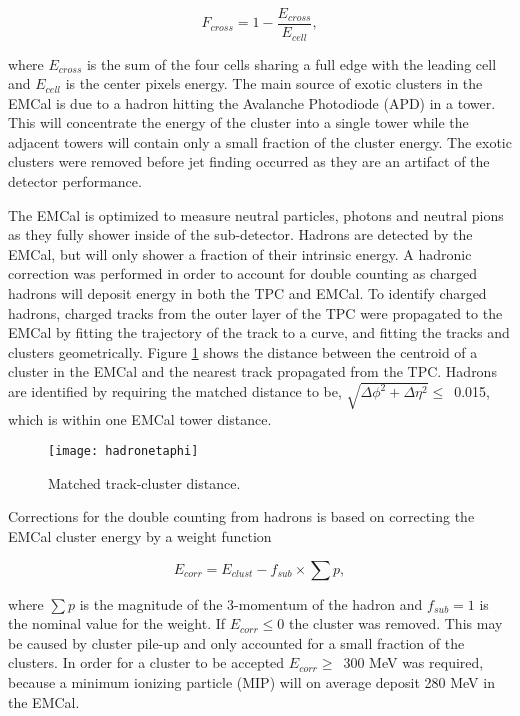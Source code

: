 \begin{equation}
F_{cross} = 1 - \frac{ E_{cross} }{ E_{cell} },
\label{eq:Fcross}
\end{equation}

\noindent
where $E_{cross}$ is the sum of the four cells sharing a full edge with the leading cell and $E_{cell}$ is the center pixels energy.  The main source of exotic clusters in the EMCal is due to a hadron hitting the Avalanche Photodiode (APD) in a tower.  This will concentrate the energy of the cluster into a single tower while the adjacent towers will contain only a small fraction of the cluster energy.  The exotic clusters were removed before jet finding occurred as they are an artifact of the detector performance.

The EMCal is optimized to measure neutral particles, photons and neutral pions as they fully shower inside of the sub-detector.  Hadrons are detected by the EMCal, but will only shower a fraction of their intrinsic energy.  A hadronic correction was performed in order to account for double counting as charged hadrons will deposit energy in both the TPC and EMCal.  To identify charged hadrons, charged tracks from the outer layer of the TPC were propagated to the EMCal by fitting the trajectory of the track to a curve, and fitting the tracks and clusters geometrically.  Figure \ref{fig:EMChadetaphi} shows the distance between the centroid of a cluster in the EMCal and the nearest track propagated from the TPC.  Hadrons are identified by requiring the matched distance to be, $\sqrt{ \Delta\phi^{2} + \Delta\eta^{2} } \leq \,$ 0.015, which is within one EMCal tower distance.

\begin{figure}[h]
\texttt{[image: hadronetaphi]}
\centering
\caption{Matched track-cluster distance.}
\label{fig:EMChadetaphi}
\end{figure}


Corrections for the double counting from hadrons is based on correcting the EMCal cluster energy by a weight function

\begin{equation}
E_{corr} = E_{clust} - f_{sub} \times \sum p ,
\label{eq:HadCorr}
\end{equation}

\noindent
where $\sum p$ is the magnitude of the 3-momentum of the hadron and $f_{sub} = 1$ is the nominal value for the weight.  If $E_{corr} \leq 0$ the cluster was removed.  This may be caused by cluster pile-up and only accounted for a small fraction of the clusters.  In order for a cluster to be accepted $E_{corr} \geq \,$ 300 MeV was required, because a minimum ionizing particle (MIP) will on average deposit 280 MeV in the EMCal.  

